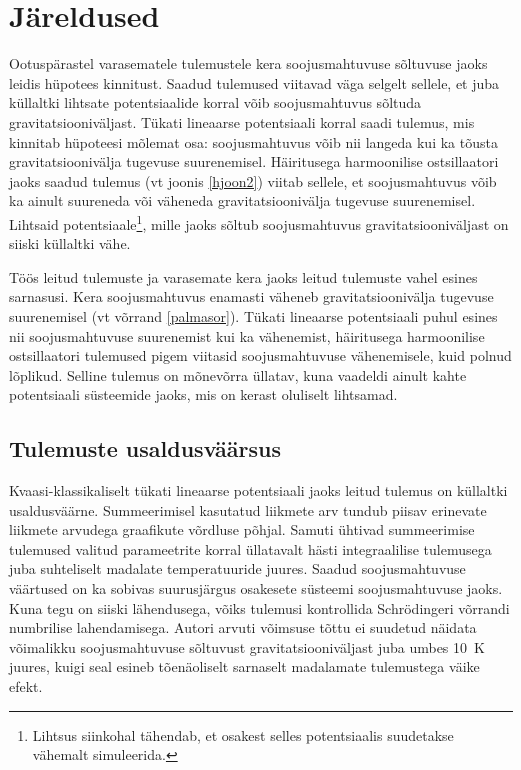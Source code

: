 \documentclass{trkut}%
\begin{document}
\section{Järeldused}

Ootuspärastel varasematele tulemustele kera soojusmahtuvuse sõltuvuse jaoks leidis hüpotees kinnitust.
Saadud tulemused viitavad väga selgelt sellele, et juba küllaltki lihtsate potentsiaalide korral võib soojusmahtuvus sõltuda gravitatsiooniväljast.
Tükati lineaarse potentsiaali korral saadi tulemus, mis kinnitab hüpoteesi mõlemat osa: soojusmahtuvus võib nii langeda kui ka tõusta gravitatsioonivälja tugevuse suurenemisel.
Häiritusega harmoonilise ostsillaatori jaoks saadud tulemus (vt joonis \ref{hjoon2}) viitab sellele, et soojusmahtuvus võib ka ainult suureneda või väheneda gravitatsioonivälja tugevuse suurenemisel.
Lihtsaid potentsiaale\footnote{Lihtsus siinkohal tähendab, et osakest selles potentsiaalis suudetakse vähemalt simuleerida.}, mille jaoks sõltub soojusmahtuvus gravitatsiooniväljast on siiski küllaltki vähe.

Töös leitud tulemuste ja varasemate kera jaoks leitud tulemuste vahel esines sarnasusi.
Kera soojusmahtuvus enamasti väheneb gravitatsioonivälja tugevuse suurenemisel (vt võrrand \eqref{palmasor}).
Tükati lineaarse potentsiaali puhul esines nii soojusmahtuvuse suurenemist kui ka vähenemist, häiritusega harmoonilise ostsillaatori tulemused pigem viitasid soojusmahtuvuse vähenemisele, kuid polnud lõplikud.
Selline tulemus on mõnevõrra üllatav, kuna vaadeldi ainult kahte potentsiaali süsteemide jaoks, mis on kerast oluliselt lihtsamad.


\subsection{Tulemuste usaldusväärsus}

Kvaasi-klassikaliselt tükati lineaarse potentsiaali jaoks leitud tulemus on küllaltki usaldusväärne.
Summeerimisel kasutatud liikmete arv tundub piisav erinevate liikmete arvudega graafikute võrdluse põhjal.
Samuti ühtivad summeerimise tulemused valitud parameetrite korral üllatavalt hästi integraalilise tulemusega juba suhteliselt madalate temperatuuride juures.
Saadud soojusmahtuvuse väärtused on ka sobivas suurusjärgus osakesete süsteemi soojusmahtuvuse jaoks.
Kuna tegu on siiski lähendusega, võiks tulemusi kontrollida Schrödingeri võrrandi numbrilise lahendamisega.
Autori arvuti võimsuse tõttu ei suudetud näidata võimalikku soojusmahtuvuse sõltuvust gravitatsiooniväljast juba umbes \SI{10}{K} juures, kuigi seal esineb tõenäoliselt sarnaselt madalamate tulemustega väike efekt.
\end{document}
